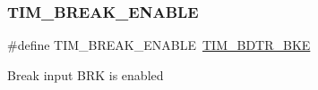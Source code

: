 \subsubsection{\texorpdfstring{TIM\_BREAK\_ENABLE}{TIM\_BREAK\_ENABLE}}
{\footnotesize\ttfamily \#define T\+I\+M\+\_\+\+B\+R\+E\+A\+K\+\_\+\+E\+N\+A\+B\+LE~\mbox{\hyperlink{group___peripheral___registers___bits___definition_ga74250b040dd9fd9c09dcc54cdd6d86d8}{T\+I\+M\+\_\+\+B\+D\+T\+R\+\_\+\+B\+KE}}}

Break input B\+RK is enabled 